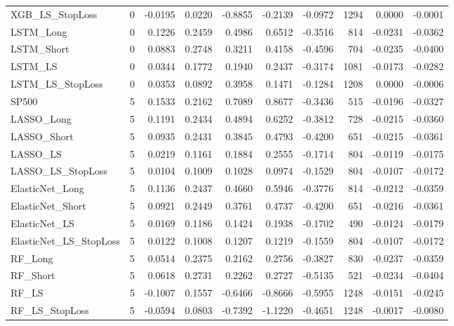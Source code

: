 \begin{tabular}{llrrrrrrrr}
\cline{1-10}
XGB\_LS\_StopLoss & 0 & -0.0195 & 0.0220 & -0.8855 & -0.2139 & -0.0972 & 1294 & 0.0000 & -0.0001 \\
\cline{1-10}
LSTM\_Long & 0 & 0.1226 & 0.2459 & 0.4986 & 0.6512 & -0.3516 & 814 & -0.0231 & -0.0362 \\
\cline{1-10}
LSTM\_Short & 0 & 0.0883 & 0.2748 & 0.3211 & 0.4158 & -0.4596 & 704 & -0.0235 & -0.0400 \\
\cline{1-10}
LSTM\_LS & 0 & 0.0344 & 0.1772 & 0.1940 & 0.2437 & -0.3174 & 1081 & -0.0173 & -0.0282 \\
\cline{1-10}
LSTM\_LS\_StopLoss & 0 & 0.0353 & 0.0892 & 0.3958 & 0.1471 & -0.1284 & 1208 & 0.0000 & -0.0006 \\
\cline{1-10}
SP500 & 5 & 0.1533 & 0.2162 & 0.7089 & 0.8677 & -0.3436 & 515 & -0.0196 & -0.0327 \\
\cline{1-10}
LASSO\_Long & 5 & 0.1191 & 0.2434 & 0.4894 & 0.6252 & -0.3812 & 728 & -0.0215 & -0.0360 \\
\cline{1-10}
LASSO\_Short & 5 & 0.0935 & 0.2431 & 0.3845 & 0.4793 & -0.4200 & 651 & -0.0215 & -0.0361 \\
\cline{1-10}
LASSO\_LS & 5 & 0.0219 & 0.1161 & 0.1884 & 0.2555 & -0.1714 & 804 & -0.0119 & -0.0175 \\
\cline{1-10}
LASSO\_LS\_StopLoss & 5 & 0.0104 & 0.1009 & 0.1028 & 0.0974 & -0.1529 & 804 & -0.0107 & -0.0172 \\
\cline{1-10}
ElasticNet\_Long & 5 & 0.1136 & 0.2437 & 0.4660 & 0.5946 & -0.3776 & 814 & -0.0212 & -0.0359 \\
\cline{1-10}
ElasticNet\_Short & 5 & 0.0921 & 0.2449 & 0.3761 & 0.4737 & -0.4200 & 651 & -0.0216 & -0.0361 \\
\cline{1-10}
ElasticNet\_LS & 5 & 0.0169 & 0.1186 & 0.1424 & 0.1938 & -0.1702 & 490 & -0.0124 & -0.0179 \\
\cline{1-10}
ElasticNet\_LS\_StopLoss & 5 & 0.0122 & 0.1008 & 0.1207 & 0.1219 & -0.1559 & 804 & -0.0107 & -0.0172 \\
\cline{1-10}
RF\_Long & 5 & 0.0514 & 0.2375 & 0.2162 & 0.2756 & -0.3827 & 830 & -0.0237 & -0.0359 \\
\cline{1-10}
RF\_Short & 5 & 0.0618 & 0.2731 & 0.2262 & 0.2727 & -0.5135 & 521 & -0.0234 & -0.0404 \\
\cline{1-10}
RF\_LS & 5 & -0.1007 & 0.1557 & -0.6466 & -0.8666 & -0.5955 & 1248 & -0.0151 & -0.0245 \\
\cline{1-10}
RF\_LS\_StopLoss & 5 & -0.0594 & 0.0803 & -0.7392 & -1.1220 & -0.4651 & 1248 & -0.0017 & -0.0080 \\

\end{tabular}
